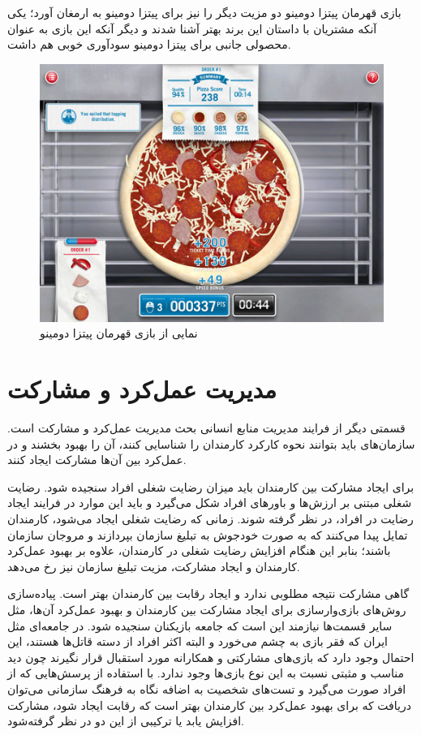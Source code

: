 بازی قهرمان پیتزا دومینو دو مزیت دیگر را نیز برای پیتزا دومینو به ارمغان آورد‌؛ یکی آنکه مشتریان با داستان این برند بهتر آشنا شدند و دیگر آنکه این بازی به عنوان محصولی جانبی برای پیتزا دومینو سودآوری خوبی هم داشت.
\begin{figure}[!htb]
	\centering
	\includegraphics[width=\textwidth]{Figures/domino.png}
	\caption{نمایی از بازی قهرمان پیتزا دومینو}
\end{figure}

\section{مدیریت عمل‌کرد و مشارکت}
قسمتی دیگر از فرایند مدیریت منابع انسانی بحث مدیریت عمل‌کرد و مشارکت است. سازمان‌های باید بتوانند نحوه کارکرد کارمندان را شناسایی کنند، آن را بهبود بخشند و در عمل‌کرد بین آن‌ها مشارکت ایجاد کنند.

برای ایجاد مشارکت بین کارمندان باید میزان رضایت شغلی افراد سنجیده شود. رضایت شغلی مبتنی بر ارزش‌ها و باورهای افراد شکل می‌گیرد و باید این موارد در فرایند ایجاد رضایت در افراد، در نظر گرفته شوند. زمانی که رضایت شغلی ایجاد می‌شود، کارمندان تمایل پیدا می‌کنند که به صورت خودجوش به تبلیغ سازمان بپردازند و مروجان سازمان باشند؛ بنابر این هنگام افزایش رضایت شغلی در کارمندان، علاوه بر بهبود عمل‌کرد کارمندان و ایجاد مشارکت، مزیت تبلیغ سازمان نیز رخ می‌دهد.

گاهی مشارکت نتیجه مطلوبی ندارد و ایجاد رقابت بین کارمندان بهتر است. پیاده‌سازی روش‌های بازی‌وارسازی برای ایجاد مشارکت بین کارمندان و بهبود عمل‌کرد آن‌ها، مثل سایر قسمت‌ها نیازمند این است که جامعه بازیکنان سنجیده شود. در جامعه‌ای مثل ایران که فقر بازی به چشم می‌خورد و البته اکثر افراد از دسته قاتل‌ها هستند، این احتمال وجود دارد که بازی‌های مشارکتی و همکارانه مورد استقبال قرار نگیرند چون دید مناسب و مثبتی نسبت به این نوع بازی‌ها وجود ندارد. با استفاده از پرسش‌هایی که از افراد صورت می‌گیرد و تست‌های شخصیت به اضافه نگاه به فرهنگ سازمانی می‌توان دریافت که برای بهبود عمل‌کرد بین کارمندان بهتر است که رقابت ایجاد شود، مشارکت افزایش یابد یا ترکیبی از این دو در نظر گرفته‌شود.

